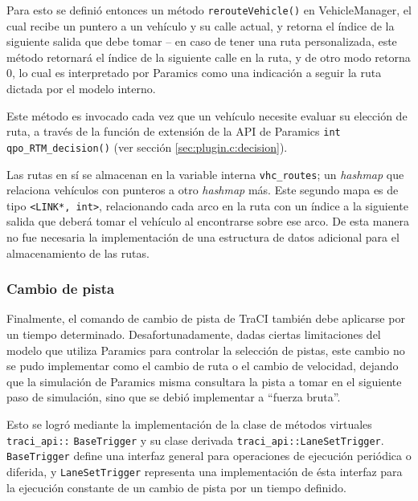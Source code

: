 Para esto se definió entonces un método \texttt{rerouteVehicle()} en VehicleManager, el cual recibe un puntero a un vehículo y su calle actual, y retorna el índice de la siguiente salida que debe tomar -- en caso de tener una ruta personalizada, este método retornará el índice de la siguiente calle en la ruta, y de otro modo retorna 0, lo cual es interpretado por Paramics como una indicación a seguir la ruta dictada por el modelo interno.



Este método es invocado cada vez que un vehículo necesite evaluar su elección de ruta, a través de la función de extensión de la API de Paramics \texttt{int qpo\_RTM\_decision()} (ver sección \ref{sec:plugin.c:decision}).

Las rutas en sí se almacenan en la variable interna \texttt{vhc\_routes}; un \emph{hashmap} que relaciona vehículos con punteros a otro \emph{hashmap} más. Este segundo mapa es de tipo 
\texttt{<LINK*, int>}, relacionando cada arco en la ruta con un índice a la siguiente salida que deberá tomar el vehículo al encontrarse sobre ese arco. De esta manera no fue necesaria la implementación de una estructura de datos adicional para el almacenamiento de las rutas.

\subsubsection{Cambio de pista}\label{sec:laneoverride}

Finalmente, el comando de cambio de pista de TraCI también debe aplicarse por un tiempo determinado. Desafortunadamente, dadas ciertas limitaciones del modelo que utiliza Paramics para controlar la selección de pistas, este cambio no se pudo implementar como el cambio de ruta o el cambio de velocidad, dejando que la simulación de Paramics misma consultara la pista a tomar en el siguiente paso de simulación, sino que se debió implementar a ``fuerza bruta''.

Esto se logró mediante la implementación de la clase de métodos virtuales \texttt{traci\_api::}
\texttt{BaseTrigger} y su clase derivada \texttt{traci\_api::LaneSetTrigger}. \texttt{BaseTrigger} define una interfaz general para operaciones de ejecución periódica o diferida, y \texttt{LaneSetTrigger} representa una implementación de ésta interfaz para la ejecución constante de un cambio de pista por un tiempo definido.

